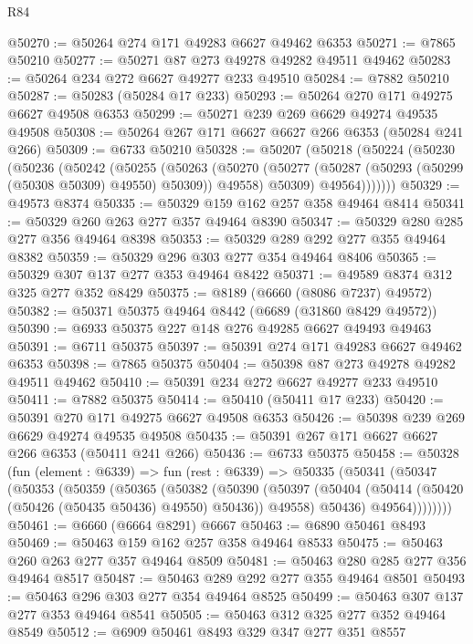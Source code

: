 \begin{lexlean}{R84}
\begin{coremodule}
@50270 := @50264 @274 @171 @49283 @6627 @49462 @6353
@50271 := @7865 @50210
@50277 := @50271 @87 @273 @49278 @49282 @49511 @49462
@50283 := @50264 @234 @272 @6627 @49277 @233 @49510
@50284 := @7882 @50210
@50287 := @50283 (@50284 @17 @233)
@50293 := @50264 @270 @171 @49275 @6627 @49508 @6353
@50299 := @50271 @239 @269 @6629 @49274 @49535 @49508
@50308 := @50264 @267 @171 @6627 @6627 @266 @6353 (@50284 @241 @266)
@50309 := @6733 @50210
@50328 := @50207
    (@50218
      (@50224
        (@50230
          (@50236
            (@50242
              (@50255
                (@50263
                  (@50270
                    (@50277 (@50287 (@50293 (@50299 (@50308 @50309) @49550) @50309)) @49558)
                    @50309)
                  @49564)))))))
@50329 := @49573 @8374
@50335 := @50329 @159 @162 @257 @358 @49464 @8414
@50341 := @50329 @260 @263 @277 @357 @49464 @8390
@50347 := @50329 @280 @285 @277 @356 @49464 @8398
@50353 := @50329 @289 @292 @277 @355 @49464 @8382
@50359 := @50329 @296 @303 @277 @354 @49464 @8406
@50365 := @50329 @307 @137 @277 @353 @49464 @8422
@50371 := @49589 @8374 @312 @325 @277 @352 @8429
@50375 := @8189 (@6660 (@8086 @7237) @49572)
@50382 := @50371 @50375 @49464 @8442 (@6689 (@31860 @8429 @49572))
@50390 := @6933 @50375 @227 @148 @276 @49285 @6627 @49493 @49463
@50391 := @6711 @50375
@50397 := @50391 @274 @171 @49283 @6627 @49462 @6353
@50398 := @7865 @50375
@50404 := @50398 @87 @273 @49278 @49282 @49511 @49462
@50410 := @50391 @234 @272 @6627 @49277 @233 @49510
@50411 := @7882 @50375
@50414 := @50410 (@50411 @17 @233)
@50420 := @50391 @270 @171 @49275 @6627 @49508 @6353
@50426 := @50398 @239 @269 @6629 @49274 @49535 @49508
@50435 := @50391 @267 @171 @6627 @6627 @266 @6353 (@50411 @241 @266)
@50436 := @6733 @50375
@50458 := @50328
    (fun (element : @6339) =>
    fun (rest : @6339) =>
    @50335
      (@50341
        (@50347
          (@50353
            (@50359
              (@50365
                (@50382
                  (@50390
                    (@50397
                      (@50404 (@50414 (@50420 (@50426 (@50435 @50436) @49550) @50436)) @49558)
                      @50436)
                    @49564))))))))
@50461 := @6660 (@6664 @8291) @6667
@50463 := @6890 @50461 @8493
@50469 := @50463 @159 @162 @257 @358 @49464 @8533
@50475 := @50463 @260 @263 @277 @357 @49464 @8509
@50481 := @50463 @280 @285 @277 @356 @49464 @8517
@50487 := @50463 @289 @292 @277 @355 @49464 @8501
@50493 := @50463 @296 @303 @277 @354 @49464 @8525
@50499 := @50463 @307 @137 @277 @353 @49464 @8541
@50505 := @50463 @312 @325 @277 @352 @49464 @8549
@50512 := @6909 @50461 @8493 @329 @347 @277 @351 @8557

\end{coremodule}
\end{lexlean}

